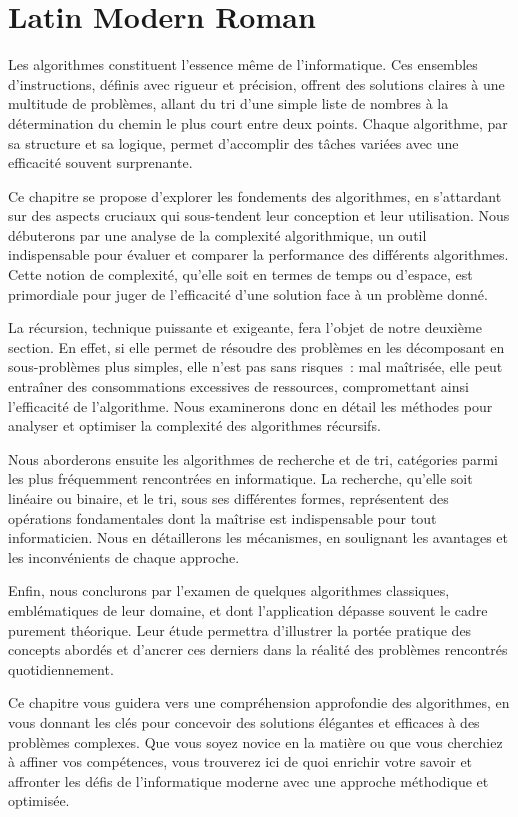 \documentclass[10pt]{article}
\begin{document}
\section{Latin Modern Roman}

Les algorithmes constituent l'essence même de l'informatique. Ces ensembles d'instructions, définis avec rigueur et précision, offrent des solutions claires à une multitude de problèmes, allant du tri d'une simple liste de nombres à la détermination du chemin le plus court entre deux points. Chaque algorithme, par sa structure et sa logique, permet d'accomplir des tâches variées avec une efficacité souvent surprenante.

Ce chapitre se propose d'explorer les fondements des algorithmes, en s'attardant sur des aspects cruciaux qui sous-tendent leur conception et leur utilisation. Nous débuterons par une analyse de la complexité algorithmique, un outil indispensable pour évaluer et comparer la performance des différents algorithmes. Cette notion de complexité, qu'elle soit en termes de temps ou d'espace, est primordiale pour juger de l'efficacité d'une solution face à un problème donné.

La récursion, technique puissante et exigeante, fera l'objet de notre deuxième section. En effet, si elle permet de résoudre des problèmes en les décomposant en sous-problèmes plus simples, elle n'est pas sans risques~: mal maîtrisée, elle peut entraîner des consommations excessives de ressources, compromettant ainsi l'efficacité de l'algorithme. Nous examinerons donc en détail les méthodes pour analyser et optimiser la complexité des algorithmes récursifs.

Nous aborderons ensuite les algorithmes de recherche et de tri, catégories parmi les plus fréquemment rencontrées en informatique. La recherche, qu'elle soit linéaire ou binaire, et le tri, sous ses différentes formes, représentent des opérations fondamentales dont la maîtrise est indispensable pour tout informaticien. Nous en détaillerons les mécanismes, en soulignant les avantages et les inconvénients de chaque approche.

Enfin, nous conclurons par l'examen de quelques algorithmes classiques, emblématiques de leur domaine, et dont l'application dépasse souvent le cadre purement théorique. Leur étude permettra d'illustrer la portée pratique des concepts abordés et d'ancrer ces derniers dans la réalité des problèmes rencontrés quotidiennement.

Ce chapitre vous guidera vers une compréhension approfondie des algorithmes, en vous donnant les clés pour concevoir des solutions élégantes et efficaces à des problèmes complexes. Que vous soyez novice en la matière ou que vous cherchiez à affiner vos compétences, vous trouverez ici de quoi enrichir votre savoir et affronter les défis de l'informatique moderne avec une approche méthodique et optimisée.
\end{document}
